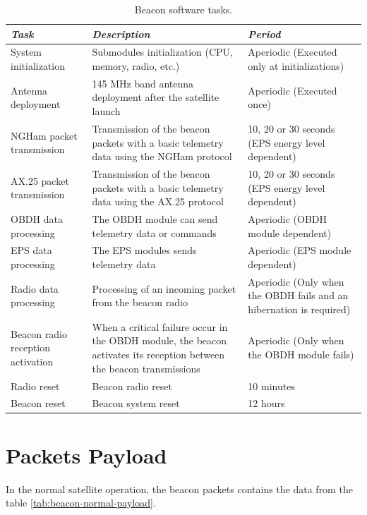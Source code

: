 \documentclass[12pt]{book}
\begin{document}
\begin{table}[!h]
	\begin{center}
		\begin{tabular}{L{0.2\textwidth} C{0.4\textwidth} C{0.3\textwidth}}
			\toprule[1.5pt]
			\textit{Task} & \textit{Description} & \textit{Period} \\
			\midrule
			System initialization & Submodules initialization (CPU, memory, radio, etc.) & Aperiodic (Executed only at initializations) \\
			Antenna deployment & 145 MHz band antenna deployment after the satellite launch & Aperiodic (Executed once) \\
			NGHam packet transmission & Transmission of the beacon packets with a basic telemetry data using the NGHam protocol & 10, 20 or 30 seconds (EPS energy level dependent) \\
			AX.25 packet transmission & Transmission of the beacon packets with a basic telemetry data using the AX.25 protocol & 10, 20 or 30 seconds (EPS energy level dependent) \\
			OBDH data processing & The OBDH module can send telemetry data or commands & Aperiodic (OBDH module dependent) \\
			EPS data processing & The EPS modules sends telemetry data & Aperiodic (EPS module dependent) \\
			Radio data processing & Processing of an incoming packet from the beacon radio & Aperiodic (Only when the OBDH fails and an hibernation is required) \\
			Beacon radio reception activation & When a critical failure occur in the OBDH module, the beacon activates its reception between the beacon transmissions & Aperiodic (Only when the OBDH module fails) \\
			Radio reset & Beacon radio reset & 10 minutes \\
			Beacon reset & Beacon system reset & 12 hours \\
			\bottomrule[1.5pt]
		\end{tabular}
		\caption{Beacon software tasks.}
		\label{tab:sw_tasks}
	\end{center}
\end{table}

\section{Packets Payload}

In the normal satellite operation, the beacon packets contains the data from the table \ref{tab:beacon-normal-payload}.
\end{document}

